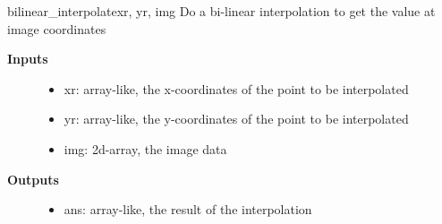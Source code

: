 \documentclass[letterpaper,10pt,english]{manual}
\begin{document}
\hypertarget{odysseus.imageprocess.bilinear_interpolate}{}\begin{funcdesc}{bilinear\_interpolate}{xr, yr, img}
Do a bi-linear interpolation to get the value at image coordinates
\begin{description}
\item[\textbf{Inputs}] \leavevmode\begin{itemize}
\item {} 
xr: array-like, the x-coordinates of the point to be interpolated

\item {} 
yr: array-like, the y-coordinates of the point to be interpolated

\item {} 
img: 2d-array, the image data

\end{itemize}

\item[\textbf{Outputs}] \leavevmode\begin{itemize}
\item {} 
ans: array-like, the result of the interpolation

\end{itemize}

\end{description}
\end{funcdesc}
\end{document}
